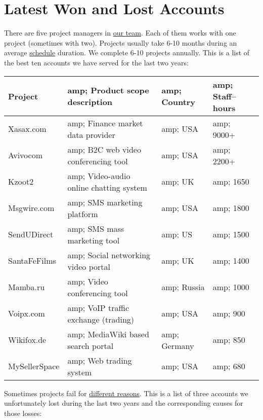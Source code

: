 
\section*{Latest Won and Lost Accounts}

There are five project managers in \href{${url:about/teams}}{our team}. Each of them
works with one project (sometimes with two). Projects usually take 6-10 months during an average 
\href{${url:process/time/schedule}}{schedule} duration. We
complete 6-10 projects annually. This is a list of the best ten accounts we have served 
for the last two years:
	       
\begin{center}\small%
\begin{tabular}{l>{\raggedright}p{6cm}lp{2cm}}
Project &amp; 		Product scope description &amp; 	Country &amp; 	Staff--hours \\
\hline
Xasax.com &amp; 	Finance market data provider &amp; 	USA &amp;	9000+ \\
Avivocom &amp; 		B2C web video conferencing tool &amp; 	USA &amp;	2200+ \\
Kzoot2 &amp; 		Video-audio online chatting 
			system &amp;				UK &amp;	1650 \\
Msgwire.com &amp; 	SMS marketing platform &amp; 		USA &amp;	1800 \\
SendUDirect &amp; 	SMS mass marketing tool &amp;		US &amp;	1500 \\
SantaFeFilms &amp; 	Social networking video portal &amp;	UK &amp;	1400 \\
Mamba.ru &amp; 		Video conferencing tool &amp; 		Russia &amp;	1000 \\
Voipx.com &amp; 	VoIP traffic exchange (trading) &amp; 	USA &amp;	900 \\
Wikifox.de &amp; 	MediaWiki based search portal &amp; 	Germany &amp;	850 \\
MySellerSpace &amp; 	Web trading system &amp; 		USA &amp;	680 \\
\end{tabular}\end{center}

Sometimes projects fail for \href{${url:process/risk/risk}}{different reasons}. This is a list of 
three accounts we unfortunately lost during the last two years and the corresponding causes
for those losses:

